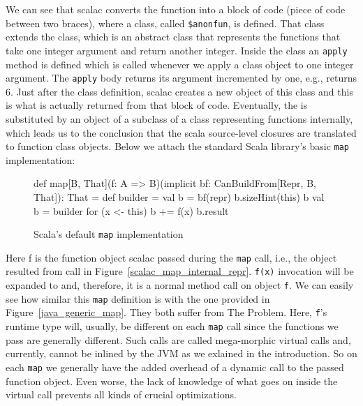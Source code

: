 We can see that scalac converts the  function into a block of code
(piece of code between two braces), where a class, called \texttt{\$anonfun}, is defined.
That class extends the  class, which is an abstract
class that represents the functions that take one integer argument and return
another integer. Inside the class an \texttt{apply} method is defined which is called
whenever we apply a class object to one integer argument. The \texttt{apply} body
returns  its argument incremented by one,  e.g.,  returns $6$. Just after the class definition, scalac creates a new object
of this class and this is what is actually returned from that block of code.
Eventually, the  is substituted by an object of a subclass of a class
representing functions internally, which leads us to the conclusion that the
scala source-level closures are translated to function class objects. Below we
attach the standard Scala library's basic \texttt{map} implementation:

\begin{figure}
\begin{scalaCode}
def map[B, That](f: A => B)(implicit bf: CanBuildFrom[Repr, B, That]): That =
{
    def builder = {
      val b = bf(repr)
      b.sizeHint(this)
      b
    }
    val b = builder
    for (x <- this) b += f(x)
    b.result
}
\end{scalaCode}
\caption[Scala's default \texttt{map} implementation]{Scala's default \texttt{map} implementation}
\label{scala_map}
\end{figure}

Here f is the function object scalac passed during the \texttt{map} call, i.e., the
object resulted from  call in Figure~\ref{scalac_map_internal_repr}. 
\texttt{f(x)} invocation will be expanded to
 and, therefore, it is a normal method call on object \texttt{f}. We can easily see
how similar this \texttt{map} definition is with the one provided in Figure~\ref{java_generic_map}.
They both suffer from The Problem. Here, \texttt{f}'s runtime type will, usually, be
different on each \texttt{map} call since the functions we pass are generally different.
Such calls are called mega-morphic virtual calls and, currently, cannot be inlined
by the JVM as we exlained in the introduction. So on each \texttt{map} we
generally have the added overhead of a dynamic call to the passed function
object. Even worse, the lack of knowledge of what goes on inside the virtual
call prevents all kinds of crucial optimizations.

